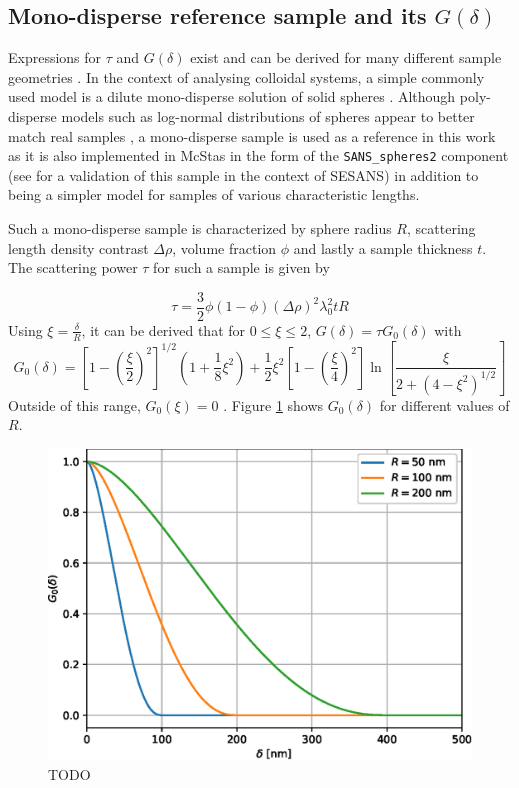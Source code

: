 \documentclass{article}
\begin{document}
\subsection{Mono-disperse reference sample and its $G(\delta)$}
\label{c2.4}
Expressions for $\tau$ and $G(\delta)$ exist and can be derived for many different sample geometries \cite{andersson2008}. In the context of analysing colloidal systems, a simple commonly used model is a dilute mono-disperse solution of solid spheres \cite{tromp2007}. Although poly-disperse models such as log-normal distributions of spheres appear to better match real samples \cite{heijkamp2011}, a mono-disperse sample is used as a reference in this work as it is also implemented in McStas in the form of the \texttt{SANS\_spheres2} component (see \cite{parnell2024} for a validation of this sample in the context of SESANS) in addition to being a simpler model for samples of various characteristic lengths. 

Such a mono-disperse sample is characterized by sphere radius $R$, scattering length density contrast $\Delta\rho$, volume fraction $\phi$ and lastly a sample thickness $t$. The scattering power $\tau$ for such a sample is given by

\begin{equation}
	\tau = \frac{3}{2}\phi (1 - \phi) (\Delta\rho)^2\lambda_0^2tR \label{eq:sample-tau}
\end{equation}
Using $\xi = \frac{\delta}{R}$, it can be derived that for $0\leq \xi \leq 2$, $G(\delta) = \tau G_0(\delta)$ with 
\begin{equation}
	G_0(\delta) = \left[1 - \left(\frac{\xi}{2}\right)^2\right]^{1/2}\left(1 + \frac{1}{8}\xi^2\right) + \frac{1}{2}\xi^2\left[1 - \left(\frac{\xi}{4}\right)^2\right]\ln \left[\frac{\xi}{2 + (4 - \xi^2)^{1/2}}\right] \label{eq:sample-G0}
\end{equation}
Outside of this range, $G_0(\xi) = 0$ \cite{krouglov2003}. Figure \ref{fig:analytical-G0} shows $G_0(\delta)$ for different values of $R$. 

\begin{figure}
	\centering
	\includegraphics[width=0.5\linewidth]{analytical-G0}
	\caption{TODO}
	\label{fig:analytical-G0}
\end{figure}
\end{document}

